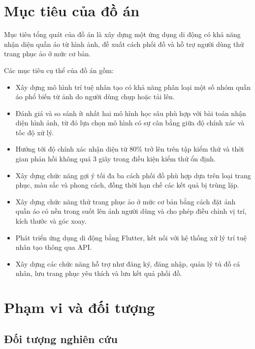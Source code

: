 \section{Mục tiêu của đồ án}

Mục tiêu tổng quát của đồ án là xây dựng một ứng dụng di động có khả năng
nhận diện quần áo từ hình ảnh, đề xuất cách phối đồ và hỗ trợ người dùng thử
trang phục ảo ở mức cơ bản.

Các mục tiêu cụ thể của đồ án gồm:

\begin{itemize}[leftmargin=1.6em, itemsep=3pt]
  \item Xây dựng mô hình trí tuệ nhân tạo có khả năng phân loại một số nhóm
        quần áo phổ biến từ ảnh do người dùng chụp hoặc tải lên.

  \item Đánh giá và so sánh ít nhất hai mô hình học sâu phù hợp với bài toán
        nhận diện hình ảnh, từ đó lựa chọn mô hình có sự cân bằng giữa độ
        chính xác và tốc độ xử lý.

  \item Hướng tới độ chính xác nhận diện từ 80\% trở lên trên tập kiểm thử
        và thời gian phản hồi không quá 3 giây trong điều kiện kiểm thử ổn
        định.

  \item Xây dựng chức năng gợi ý tối đa ba cách phối đồ phù hợp dựa trên loại
        trang phục, màu sắc và phong cách, đồng thời hạn chế các kết quả bị
        trùng lặp.

  \item Xây dựng chức năng thử trang phục ảo ở mức cơ bản bằng cách đặt ảnh
        quần áo có nền trong suốt lên ảnh người dùng và cho phép điều chỉnh
        vị trí, kích thước và góc xoay.

  \item Phát triển ứng dụng di động bằng Flutter, kết nối với hệ thống xử lý
        trí tuệ nhân tạo thông qua API.

  \item Xây dựng các chức năng hỗ trợ như đăng ký, đăng nhập, quản lý tủ đồ
        cá nhân, lưu trang phục yêu thích và lưu kết quả phối đồ.
\end{itemize}

\section{Phạm vi và đối tượng}

\subsection{Đối tượng nghiên cứu}

